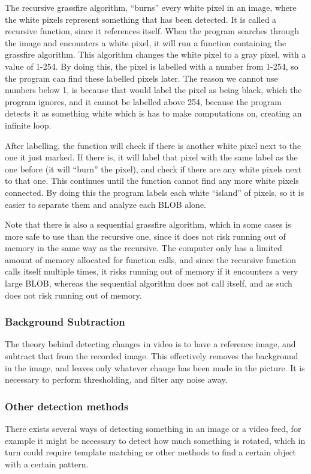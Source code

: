 The recursive grassfire algorithm, “burns” every white pixel in an image, where the white pixels represent something that has been detected. It is called a recursive function, since it references itself. When the program searches through the image and encounters a white pixel, it will run a function containing the grassfire algorithm. This algorithm changes the white pixel to a gray pixel, with a value of 1-254. By doing this, the pixel is labelled with a number from 1-254, so the program can find these labelled pixels later. The reason we cannot use numbers below 1, is because that would label the pixel as being black, which the program ignores, and it cannot be labelled above 254, because the program detects it as something white which is has to make computations on, creating an infinite loop.

After labelling, the function will check if there is another white pixel next to the one it just marked. If there is, it will label that pixel with the same label as the one before (it will “burn” the pixel), and check if there are any white pixels next to that one. This continues until the function cannot find any more white pixels connected.
By doing this the program labels each white “island” of pixels, so it is easier to separate them and analyze each BLOB alone.

Note that there is also a sequential grassfire algorithm, which in some cases is more safe to use than the recursive one, since it does not risk running out of memory in the same way as the recursive. The computer only has a limited amount of memory allocated for function calls, and since the recursive function calls itself multiple times, it risks running out of memory if it encounters a very large BLOB, whereas the sequential algorithm does not call itself, and as such does not risk running out of memory. \parencite{Moeslund2012}

\subsubsection{Background Subtraction} \label{sec:BGSub}
The theory behind detecting changes in video is to have a reference image, and subtract that from the recorded image. This effectively removes the background in the image, and leaves only whatever change has been made in the picture. It is necessary to perform thresholding, and filter any noise away.

\subsubsection{Other detection methods}
There exists several ways of detecting something in an image or a video feed, for example it might be necessary to detect how much something is rotated, which in turn could require template matching or other methods to find a certain object with a certain pattern.

